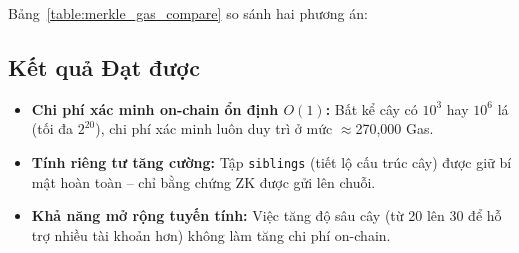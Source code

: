 \documentclass[../DoAn.tex]{subfiles}
\begin{document}
Bảng~\ref{table:merkle_gas_compare} so sánh hai phương án:

\begin{table}[H]
\centering
{}
\caption{So sánh chi phí Gas giữa xác minh Merkle on-chain và mô hình ZK-Relayer}
\label{table:merkle_gas_compare}
\end{table}

\subsection{Kết quả Đạt được}
\label{subsec:merkle_result}

\begin{itemize}
    \item \textbf{Chi phí xác minh on-chain ổn định $O(1)$:} Bất kể cây có $10^3$ hay $10^6$ lá (tối đa $2^{20}$), chi phí xác minh luôn duy trì ở mức $\approx$270,000 Gas.
    \item \textbf{Tính riêng tư tăng cường:} Tập \texttt{siblings} (tiết lộ cấu trúc cây) được giữ bí mật hoàn toàn -- chỉ bằng chứng ZK được gửi lên chuỗi.
    \item \textbf{Khả năng mở rộng tuyến tính:} Việc tăng độ sâu cây (từ 20 lên 30 để hỗ trợ nhiều tài khoản hơn) không làm tăng chi phí on-chain.
\end{itemize}
\end{document}
